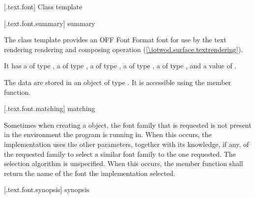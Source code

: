 
 [\iotwod.text.font] {Class template }

 [\iotwod.text.font.summary] { summary}

\pnum
{}%
The  class template provides an OFF Font Format font for use by the text rendering rendering and composing operation (\ref{\iotwod.surface.textrendering}).

\pnum
It has a  of type , a  of type , a  of type , a  of type , a  of type , and a  value of .

\pnum
The data are stored in an object of type . It is accessible using the  member function.

 [\iotwod.text.font.matching]{ matching}

\pnum
Sometimes when creating a  object, the font family that is requested is not present in the environment the program is running in. When this occurs, the implementation uses the other parameters, together with its knowledge, if any, of the requested family to select a similar font family to the one requested. The selection algorithm is unspecified. When this occurs, the  member function shall return the name of the font the implementation selected.

 [\iotwod.text.font.synopsis] { synopsis}

